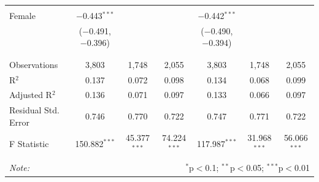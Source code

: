 \documentclass[12pt,a4paper]{article}
\numberwithin{equation}{section}
\begin{document}
\begin{landscape}
\begin{table}[!htbp]
\begin{tabular}{@{\extracolsep{5pt}}lcccccc}
			& & & & & & \\ 
			Female & $-$0.443$^{***}$ &  &  & $-$0.442$^{***}$ &  &  \\ 
			& ($-$0.491, $-$0.396) &  &  & ($-$0.490, $-$0.394) &  &  \\ 
			& & & & & & \\ 
			\hline \\[-1.8ex] 
			Observations & 3,803 & 1,748 & 2,055 & 3,803 & 1,748 & 2,055 \\ 
			R$^{2}$ & 0.137 & 0.072 & 0.098 & 0.134 & 0.068 & 0.099 \\ 
			Adjusted R$^{2}$ & 0.136 & 0.071 & 0.097 & 0.133 & 0.066 & 0.097 \\ 
			Residual Std. Error & 0.746 & 0.770 & 0.722 & 0.747 & 0.771 & 0.722 \\ 
			F Statistic & 150.882$^{***}$ & 45.377$^{***}$ & 74.224$^{***}$ & 117.987$^{***}$ & 31.968$^{***}$ & 56.066$^{***}$ \\ 
			\hline 
			\hline \\[-1.8ex] 
			\textit{Note:}  & \multicolumn{6}{r}{$^{*}$p$<$0.1; $^{**}$p$<$0.05; $^{***}$p$<$0.01} \\ 
		\end{tabular} 
	\end{table} 
	
\end{landscape}

\newpage
\end{document}

